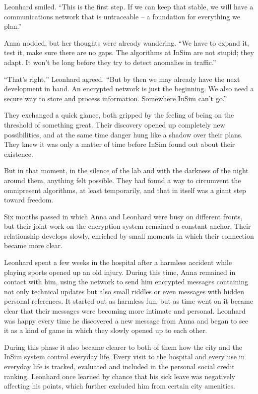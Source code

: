 \documentclass[
]{article}
\begin{document}
Leonhard smiled. ``This is the first step. If we can keep that stable,
we will have a communications network that is untraceable -- a
foundation for everything we plan.''

Anna nodded, but her thoughts were already wandering. ``We have to
expand it, test it, make sure there are no gaps. The algorithms at InSim
are not stupid; they adapt. It won't be long before they try to detect
anomalies in traffic.''

``That's right,'' Leonhard agreed. ``But by then we may already have the
next development in hand. An encrypted network is just the beginning. We
also need a secure way to store and process information. Somewhere InSim
can't go.''

They exchanged a quick glance, both gripped by the feeling of being on
the threshold of something great. Their discovery opened up completely
new possibilities, and at the same time danger hung like a shadow over
their plans. They knew it was only a matter of time before InSim found
out about their existence.

But in that moment, in the silence of the lab and with the darkness of
the night around them, anything felt possible. They had found a way to
circumvent the omnipresent algorithms, at least temporarily, and that in
itself was a giant step toward freedom.

Six months passed in which Anna and Leonhard were busy on different
fronts, but their joint work on the encryption system remained a
constant anchor. Their relationship develops slowly, enriched by small
moments in which their connection became more clear.

Leonhard spent a few weeks in the hospital after a harmless accident
while playing sports opened up an old injury. During this time, Anna
remained in contact with him, using the network to send him encrypted
messages containing not only technical updates but also small riddles or
even messages with hidden personal references. It started out as
harmless fun, but as time went on it became clear that their messages
were becoming more intimate and personal. Leonhard was happy every time
he discovered a new message from Anna and began to see it as a kind of
game in which they slowly opened up to each other.

During this phase it also became clearer to both of them how the city
and the InSim system control everyday life. Every visit to the hospital
and every use in everyday life is tracked, evaluated and included in the
personal social credit ranking. Leonhard once learned by chance that his
sick leave was negatively affecting his points, which further excluded
him from certain city amenities.
\end{document}
